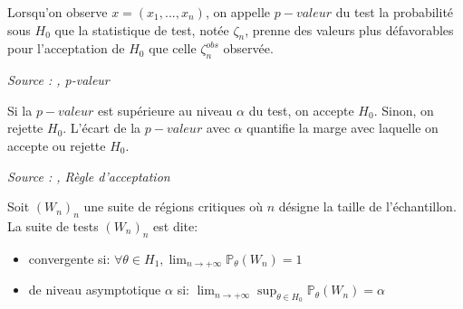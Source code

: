 \begin{definition}\label{def:p-valeur}
Lorsqu'on observe $x = (x_1, ..., x_n)$, on appelle $p-valeur$ du test la probabilité sous $H_0$ que la statistique de test, notée $\zeta_n$, prenne des valeurs plus défavorables pour l'acceptation de $H_0$ que celle $\zeta_n^{obs}$ observée.

\noindent\textit{Source : \cite{stat_ingenieur},  p-valeur}
\end{definition}

\begin{definition}\label{def:regle_acceptation}
Si la $p-valeur$ est supérieure au niveau $\alpha$ du test, on accepte $H_0$. Sinon, on rejette $H_0$.
L'écart de la $p-valeur$ avec $\alpha$ quantifie la marge avec laquelle on accepte ou rejette $H_0$.

\noindent\textit{Source : \cite{stat_ingenieur},  Règle d'acceptation}
\end{definition}

\begin{definition}\label{def:convergent_asymptotique}
Soit $(W_n)_n$ une suite de régions critiques où $n$ désigne la taille de l'échantillon. La suite de tests $(W_n)_n$ est dite:
\begin{itemize}
    \item convergente si: $\forall \theta \in H_1, \lim_{n \rightarrow +\infty} \mathbb{P}_\theta(W_n) = 1$
    \item de niveau asymptotique $\alpha$ si: $\lim_{n \rightarrow +\infty} \sup_{\theta \in H_0}\mathbb{P}_\theta(W_n) = \alpha$
\end{itemize}
\end{definition}

